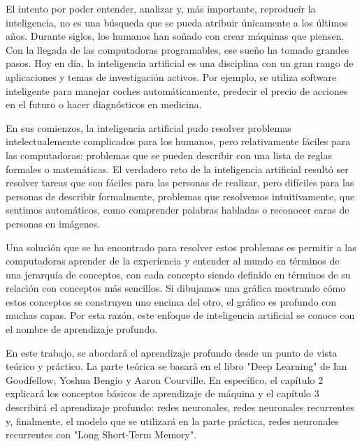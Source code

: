 \noindent
El intento por poder entender, analizar y, más importante, reproducir la inteligencia, no es una búsqueda que se pueda atribuir únicamente a los últimos años. Durante siglos, los humanos han soñado con crear máquinas que piensen. Con la llegada de las computadoras programables, ese sueño ha tomado grandes pasos. Hoy en día, la inteligencia artificial es una disciplina con un gran rango de aplicaciones y temas de investigación activos. Por ejemplo, se utiliza software inteligente para manejar coches automáticamente, predecir el precio de acciones en el futuro o hacer diagnósticos en medicina. \cite{goodfellow-et-al-2016}  \cite{hastie01statisticallearning}
\cite{Haugeland:1985:AIV:4694}

\vspace{1em}

En sus comienzos, la inteligencia artificial pudo resolver problemas intelectualemente complicados para los humanos, pero relativamente fáciles para las computadoras: problemas que se pueden describir con una lista de reglas formales o matemáticas. El verdadero reto de la inteligencia artificial resultó ser resolver tareas que son fáciles para las personas de realizar, pero difíciles para las personas de describir formalmente, problemas que resolvemos intuitivamente, que sentimos automáticos, como comprender palabras habladas o reconocer caras de personas en imágenes. 
\cite{goodfellow-et-al-2016}

\vspace{1em}

Una solución que se ha encontrado para resolver estos problemas es permitir a las computadoras aprender de la experiencia y entender al mundo en términos de una jerarquía de conceptos, con cada concepto siendo definido en términos de su relación con conceptos más sencillos. Si dibujamos una gráfica mostrando cómo estos conceptos se construyen uno encima del otro, el gráfico es profundo con muchas capas. Por esta razón, este enfoque de inteligencia artificial se conoce con el nombre de aprendizaje profundo. 
\cite{deep-learning-methods-and-applications}
\cite{goodfellow-et-al-2016}

\vspace{1em}

En este trabajo, se abordará el aprendizaje profundo desde un punto de vista teórico y práctico. La parte teórica se basará en el libro "Deep Learning" de Ian Goodfellow, Yoshua Bengio y Aaron Courville. En específico, el capítulo 2 explicará los conceptos básicos de aprendizaje de máquina y el capítulo 3 describirá el aprendizaje profundo: redes neuronales, redes neuronales recurrentes y, finalmente, el modelo que se utilizará en la parte práctica, redes neuronales recurrentes con "Long Short-Term Memory".

